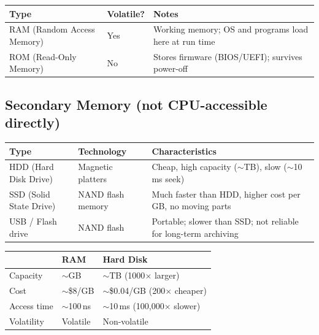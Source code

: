 \documentclass[oneside]{book}
\begin{document}
\begin{center}
\begin{tabularx}{\linewidth}{llX}
\toprule
\textbf{Type} & \textbf{Volatile?} & \textbf{Notes} \\
\midrule
RAM (Random Access Memory) & Yes & Working memory; OS and programs load here at run time \\
ROM (Read-Only Memory)     & No  & Stores firmware (BIOS/UEFI); survives power-off \\
\bottomrule
\end{tabularx}
\end{center}

\subsection*{Secondary Memory (not CPU-accessible directly)}

\begin{center}
\begin{tabularx}{\linewidth}{llX}
\toprule
\textbf{Type} & \textbf{Technology} & \textbf{Characteristics} \\
\midrule
HDD (Hard Disk Drive) & Magnetic platters     & Cheap, high capacity ($\sim$TB), slow ($\sim$10\,ms seek) \\
SSD (Solid State Drive) & NAND flash memory   & Much faster than HDD, higher cost per GB, no moving parts \\
USB / Flash drive      & NAND flash           & Portable; slower than SSD; not reliable for long-term archiving \\
\bottomrule
\end{tabularx}
\end{center}

\begin{center}
\begin{tabularx}{0.82\linewidth}{lll}
\toprule
 & \textbf{RAM} & \textbf{Hard Disk} \\
\midrule
Capacity    & $\sim$GB          & $\sim$TB (1000$\times$ larger) \\
Cost        & $\sim$\$8/GB      & $\sim$\$0.04/GB (200$\times$ cheaper) \\
Access time & $\sim$100\,ns     & $\sim$10\,ms (100,000$\times$ slower) \\
Volatility  & Volatile          & Non-volatile \\
\bottomrule
\end{tabularx}
\end{center}
\end{document}
